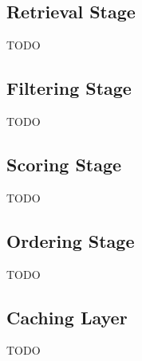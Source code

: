 \subsection{Retrieval Stage}

TODO 

\subsection{Filtering Stage}

TODO

\subsection{Scoring Stage}

TODO

\subsection{Ordering Stage}

TODO

\subsection{Caching Layer}

TODO
